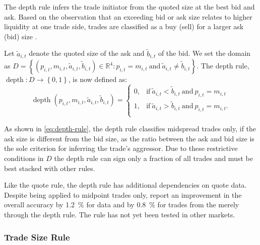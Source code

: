 The depth rule infers the trade initiator from the quoted size at the best bid and ask. Based on the observation that an exceeding bid or ask size relates to higher liquidity at one trade side, trades are classified as a buy (sell) for a larger ask (bid) size \autocite[][14]{grauerOptionTradeClassification2022}.

Let $\tilde{a}_{i,t}$ denote the quoted size of the ask and $\tilde{b}_{i,t}$ of the bid. We set the domain as $D = \left\{(p_{i,t}, m_{i,t}, \tilde{a}_{i,t}, \tilde{b}_{i,t}) \in \mathbb{R}^4: p_{i,t} = m_{i,t} \ \text{and} \ \tilde{a}_{i,t} \neq \tilde{b}_{i,t} \right\}$. The depth rule, $\operatorname{depth} \colon D \to \left\{0,1\right\}$, is now defined as:
\begin{equation}
  \operatorname{depth}(p_{i,t}, m_{i,t}, \tilde{a}_{i,t}, \tilde{b}_{i,t})=
  \begin{cases}
    0, & \text{if}\ \tilde{a}_{i,t} < \tilde{b}_{i,t} \ \text{and}\ p_{i, t} = m_{i, t} \\
    1, & \text{if}\ \tilde{a}_{i,t} > \tilde{b}_{i,t} \ \text{and}\ p_{i, t} = m_{i, t}. \\
  \end{cases}
  \label{eq:depth-rule}
\end{equation}

As shown in \cref{eq:depth-rule}, the depth rule classifies midspread trades only, if the ask size is different from the bid size, as the ratio between the ask and bid size is the sole criterion for inferring the trade's aggressor. Due to these restrictive conditions in $D$ the depth rule can sign only a fraction of all trades and must be best stacked with other rules.

Like the quote rule, the depth rule has additional dependencies on quote data. Despite being applied to midpoint trades only, \textcite[][4]{grauerOptionTradeClassification2022} report an improvement in the overall accuracy by \SI{1.2}{\percent} for  data and by \SI{0.8}{\percent} for trades from the  merely through the depth rule. The rule has not yet been tested in other markets.

\subsubsection{Trade Size Rule}\label{sec:trade-size-rule}

